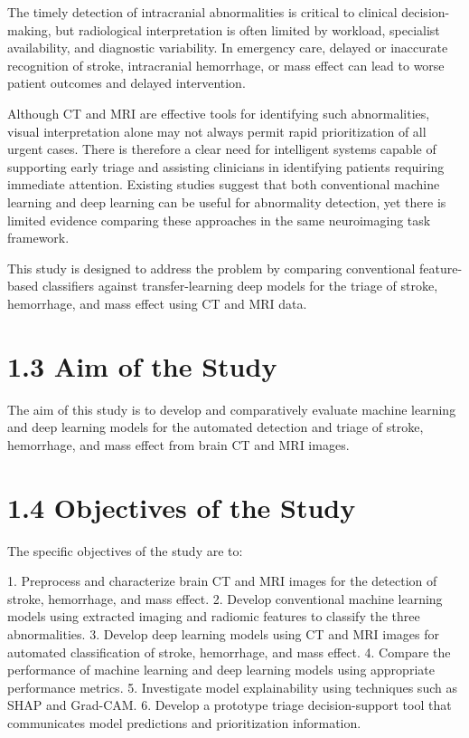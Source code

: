 \documentclass[12pt,a4paper]{report}
\begin{document}
The timely detection of intracranial abnormalities is critical to clinical decision-making, but radiological interpretation is often limited by workload, specialist availability, and diagnostic variability. In emergency care, delayed or inaccurate recognition of stroke, intracranial hemorrhage, or mass effect can lead to worse patient outcomes and delayed intervention.

Although CT and MRI are effective tools for identifying such abnormalities, visual interpretation alone may not always permit rapid prioritization of all urgent cases. There is therefore a clear need for intelligent systems capable of supporting early triage and assisting clinicians in identifying patients requiring immediate attention. Existing studies suggest that both conventional machine learning and deep learning can be useful for abnormality detection, yet there is limited evidence comparing these approaches in the same neuroimaging task framework.

This study is designed to address the problem by comparing conventional feature-based classifiers against transfer-learning deep models for the triage of stroke, hemorrhage, and mass effect using CT and MRI data.

\section{1.3 Aim of the Study}

The aim of this study is to develop and comparatively evaluate machine learning and deep learning models for the automated detection and triage of stroke, hemorrhage, and mass effect from brain CT and MRI images.

\section{1.4 Objectives of the Study}

The specific objectives of the study are to:

1. Preprocess and characterize brain CT and MRI images for the detection of stroke, hemorrhage, and mass effect.
2. Develop conventional machine learning models using extracted imaging and radiomic features to classify the three abnormalities.
3. Develop deep learning models using CT and MRI images for automated classification of stroke, hemorrhage, and mass effect.
4. Compare the performance of machine learning and deep learning models using appropriate performance metrics.
5. Investigate model explainability using techniques such as SHAP and Grad-CAM.
6. Develop a prototype triage decision-support tool that communicates model predictions and prioritization information.
\end{document}
